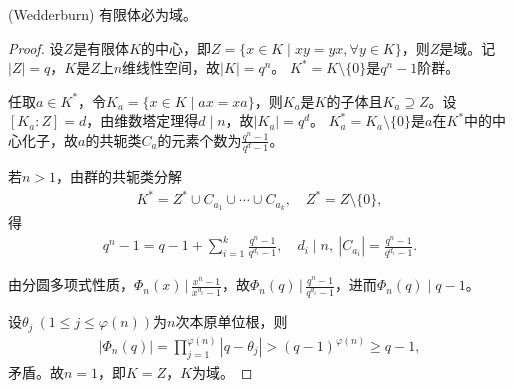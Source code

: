 \documentclass[../../main.tex]{subfiles}%
\begin{document}
\begin{theorem}
(Wedderburn) 有限体必为域。
\end{theorem}
\begin{proof}

设$Z$是有限体$K$的中心，即$Z=\{x\in K\mid xy=yx,\forall y\in K\}$，则$Z$是域。记$|Z|=q$，$K$是$Z$上$n$维线性空间，故$|K|=q^n$。
$K^*=K\setminus\{0\}$是$q^n-1$阶群。

任取$a\in K^*$，令$K_a=\{x\in K\mid ax=xa\}$，则$K_a$是$K$的子体且$K_a\supseteq Z$。设$[K_a:Z]=d$，由维数塔定理得$d\mid n$，故$|K_a|=q^d$。
$K_a^*=K_a\setminus\{0\}$是$a$在$K^*$中的中心化子，故$a$的共轭类$C_a$的元素个数为$\frac{q^n-1}{q^d-1}$。

若$n>1$，由群的共轭类分解
\begin{align*}
K^*=Z^*\cup C_{a_1}\cup\cdots\cup C_{a_k},\quad Z^*=Z\setminus\{0\},
\end{align*}
得
\begin{align*}
q^n-1=q-1+\sum\limits_{i=1}^{k}\frac{q^n-1}{q^{d_i}-1},\quad d_i\mid n,\ |C_{a_i}|=\frac{q^n-1}{q^{d_i}-1}.
\end{align*}

由分圆多项式性质，$\Phi_n(x)\,\bigg|\,\frac{x^n-1}{x^{d_i}-1}$，故$\Phi_n(q)\,\bigg|\,\frac{q^n-1}{q^{d_i}-1}$，进而$\Phi_n(q)\mid q-1$。

设$\theta_j\ (1\leqslant j\leqslant\varphi(n))$为$n$次本原单位根，则
\begin{align*}
|\Phi_n(q)|=\prod\limits_{j=1}^{\varphi(n)}|q-\theta_j|>(q-1)^{\varphi(n)}\geqslant q-1,
\end{align*}
矛盾。故$n=1$，即$K=Z$，$K$为域。

\end{proof}
\end{document}
